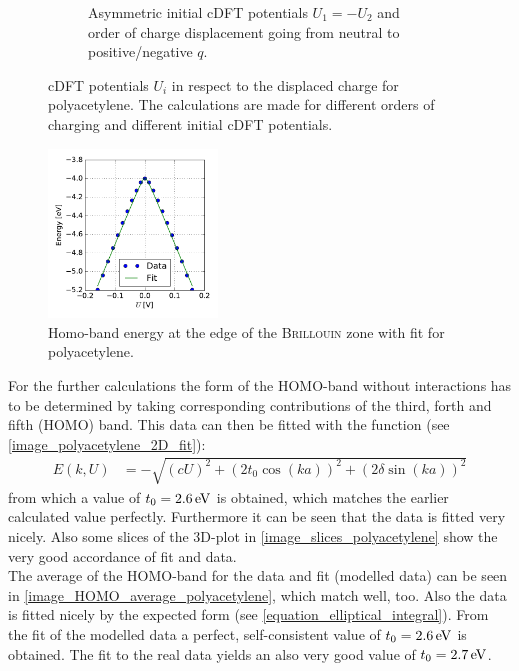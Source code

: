\begin{figure}
\begin{subfigure}{0.45\textwidth}
	\caption{Asymmetric initial cDFT potentials $U_1 = -U_2$ and order of charge displacement going from neutral to  positive/negative $q$.}
	\label{}
	\end{subfigure}
	\caption{cDFT potentials $U_i$ in respect to the displaced charge for polyacetylene. The calculations are made for different orders of charging and different initial cDFT potentials.}
	\label{image_polyacetylene_potentials_asymmetry}
\end{figure}
\begin{figure}
	\centering
	\includegraphics[width = 0.4\textwidth]{Images/polyacetylene/charging/border_energy_q_1}
	\caption{Homo-band energy at the edge of the \textsc{Brillouin} zone with fit for polyacetylene.}
	\label{image_border_energy_polyacetylene}
\end{figure}
For the further calculations the form of the HOMO-band without interactions has to be determined by taking corresponding contributions of the third, forth and fifth (HOMO) band. This data can then be fitted with the function (see \cref{image_polyacetylene_2D_fit}):
\begin{align}
	E(k, U) &= -\sqrt{\left(cU\right)^2 + \left(2t_0\cos(ka)\right)^2+\left(2\delta\sin(ka)\right)^2}
\end{align}
from which a value of $t_0 = \unit[2.6]{eV}$ is obtained, which matches the earlier calculated value perfectly. Furthermore it can be seen that the data is fitted very nicely. Also some slices of the 3D-plot in \cref{image_slices_polyacetylene} show the very good accordance of fit and data.\\
The average of the HOMO-band for the data and fit (modelled data) can be seen in \cref{image_HOMO_average_polyacetylene}, which match well, too. Also the data is fitted nicely by the expected form (see \cref{equation_elliptical_integral}). From the fit of the modelled data a perfect, self-consistent value of $t_0 = \unit[2.6]{eV}$ is obtained. The fit to the real data yields an also very good value of $t_0 = \unit[2.7]{eV}$.\\
